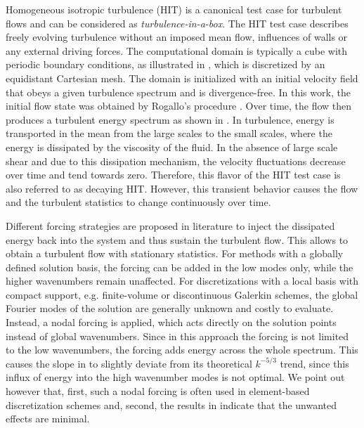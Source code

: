 Homogeneous isotropic turbulence (HIT) is a canonical test case for turbulent flows and can be considered as \textit{turbulence-in-a-box}.
The HIT test case describes freely evolving turbulence without an imposed mean flow, influences of walls or any external driving forces.
The computational domain is typically a cube with periodic boundary conditions, as illustrated in , which is discretized by an equidistant Cartesian mesh.
The domain is initialized with an initial velocity field that obeys a given turbulence spectrum and is divergence-free.
In this work, the initial flow state was obtained by Rogallo's procedure \cite{Rogallo1981}.
Over time, the flow then produces a turbulent energy spectrum as shown in .
In turbulence, energy is transported in the mean from the large scales to the small scales, where the energy is dissipated by the viscosity of the fluid.
In the absence of large scale shear and due to this dissipation mechanism, the velocity fluctuations decrease over time and tend towards zero.
Therefore, this flavor of the HIT test case is also referred to as decaying HIT.
However, this transient behavior causes the flow and the turbulent statistics to change continuously over time.

Different forcing strategies are proposed in literature to inject the dissipated energy back into the system and thus sustain the turbulent flow.
This allows to obtain a turbulent flow with stationary statistics.
For methods with a globally defined solution basis, the forcing can be added in the low modes only, while the higher wavenumbers remain unaffected.
For discretizations with a local basis with compact support, e.g. finite-volume or discontinuous Galerkin schemes, the global Fourier modes of the solution are generally unknown and costly to evaluate.
Instead, a nodal forcing is applied, which acts directly on the solution points instead of global wavenumbers.
Since in this approach the forcing is not limited to the low wavenumbers, the forcing adds energy across the whole spectrum.
This causes the slope in  to slightly deviate from its theoretical $k^{-5/3}$ trend, since this influx of energy into the high wavenumber modes is not optimal. %
We point out however that, first, such a nodal forcing is often used in element-based discretization schemes and, second, the results in  indicate that the unwanted effects are minimal.

